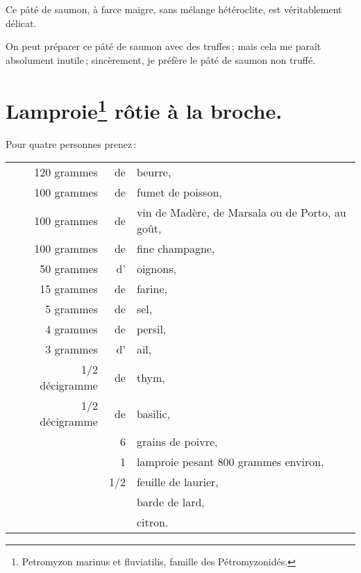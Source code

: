 Ce pâté de saumon, à farce maigre, sans mélange hétéroclite, est véritablement
délicat.

\sk

On peut préparer ce pâté de saumon avec des truffes ; mais cela me paraît
absolument inutile ; sincèrement, je préfère le pâté de saumon non truffé.

\section*{\centering Lamproie\footnote{Petromyzon marinus et fluviatilis,
famille des Pétromyzonidés.} rôtie à la broche.}

Pour quatre personnes prenez :

\footnotesize
\begin{longtable}{rrrrp{16em}}
  & \multicolumn{2}{r}{120 grammes} & de  & beurre,                                                       \\
  & \multicolumn{2}{r}{100 grammes} & de  & fumet de poisson,                                             \\
  & \multicolumn{2}{r}{100 grammes} & de  & vin de Madère, de Marsala ou de Porto, au goût,               \\
  & \multicolumn{2}{r}{100 grammes} & de  & fine champagne,                                               \\
  & \multicolumn{2}{r}{ 50 grammes} & d'  & oignons,                                                      \\
  & \multicolumn{2}{r}{ 15 grammes} & de  & farine,                                                       \\
  & \multicolumn{2}{r}{  5 grammes} & de  & sel,                                                          \\
  & \multicolumn{2}{r}{  4 grammes} & de  & persil,                                                       \\
  & \multicolumn{2}{r}{  3 grammes} & d’  & ail,                                                          \\
  & \multicolumn{2}{r}{1/2 décigramme} & de  & thym,                                                      \\
  & \multicolumn{2}{r}{1/2 décigramme} & de  & basilic,                                                   \\
  &       &         &  6  & grains de poivre,                                                             \\
  &       &         &  1  & lamproie pesant 800 grammes environ,                                          \\
  &       &         & 1/2 & feuille de laurier,                                                           \\
  &       &         &     & barde de lard,                                                                \\
  &       &         &     & citron.                                                                       \\
\end{longtable}
